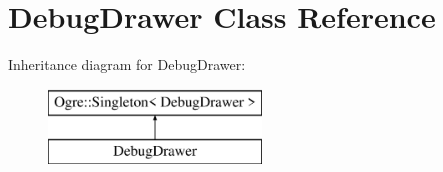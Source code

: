 \hypertarget{class_debug_drawer}{\section{Debug\-Drawer Class Reference}
\label{class_debug_drawer}
}
Inheritance diagram for Debug\-Drawer\-:\begin{figure}[H]
\begin{center}
\leavevmode
\includegraphics[height=2.000000cm]{class_debug_drawer}
\end{center}
\end{figure}
